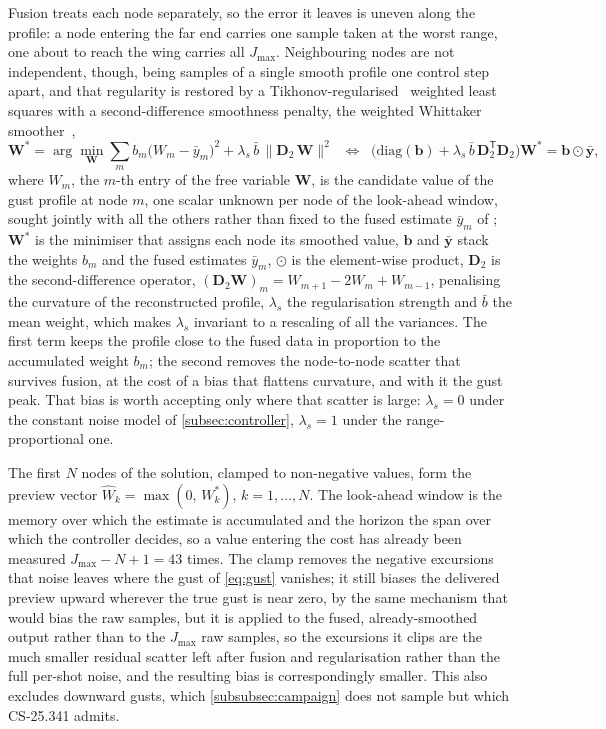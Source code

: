 Fusion treats each node separately, so the error it leaves is uneven along the profile: a node entering the far end carries one sample taken at the worst range, one about to reach the wing carries all $J_{\max}$. Neighbouring nodes are not independent, though, being samples of a single smooth profile one control step apart, and that regularity is restored by a Tikhonov-regularised~\cite{tikhonov1977solutions} weighted least squares with a second-difference smoothness penalty, the weighted Whittaker smoother~\cite{whittaker1923graduation,eilers2003perfect},
\begin{equation}
\mathbf{W}^\ast = \arg\min_{\mathbf{W}} \sum_m b_m\bigl(W_m - \bar{y}_m\bigr)^2
+ \lambda_s\,\bar{b}\,\bigl\lVert \mathbf{D}_2\,\mathbf{W} \bigr\rVert^2
\;\;\Longleftrightarrow\;\;
\bigl(\mathrm{diag}(\mathbf{b}) + \lambda_s\,\bar{b}\,\mathbf{D}_2^{\mathsf{T}}\mathbf{D}_2\bigr)\mathbf{W}^\ast = \mathbf{b}\odot\bar{\mathbf{y}},
\label{eq:tikhonov}
\end{equation}
where $W_m$, the $m$-th entry of the free variable $\mathbf{W}$, is the candidate value of the gust profile at node $m$, one scalar unknown per node of the look-ahead window, sought jointly with all the others rather than fixed to the fused estimate $\bar{y}_m$ of ; $\mathbf{W}^\ast$ is the minimiser that assigns each node its smoothed value, $\mathbf{b}$ and $\bar{\mathbf{y}}$ stack the weights $b_m$ and the fused estimates $\bar{y}_m$, $\odot$ is the element-wise product, $\mathbf{D}_2$ is the second-difference operator, $(\mathbf{D}_2\mathbf{W})_m = W_{m+1} - 2W_m + W_{m-1}$, penalising the curvature of the reconstructed profile, $\lambda_s$ the regularisation strength and $\bar{b}$ the mean weight, which makes $\lambda_s$ invariant to a rescaling of all the variances. The first term keeps the profile close to the fused data in proportion to the accumulated weight $b_m$; the second removes the node-to-node scatter that survives fusion, at the cost of a bias that flattens curvature, and with it the gust peak. That bias is worth accepting only where that scatter is large: $\lambda_s = 0$ under the constant noise model of \cref{subsec:controller}, $\lambda_s = 1$ under the range-proportional one.

The first $N$ nodes of the solution, clamped to non-negative values, form the preview vector $\widehat{W}_k = \max(0,\,W_k^\ast)$, $k = 1,\dots,N$. The look-ahead window is the memory over which the estimate is accumulated and the horizon the span over which the controller decides, so a value entering the cost has already been measured $J_{\max}-N+1 = 43$ times. The clamp removes the negative excursions that noise leaves where the gust of \cref{eq:gust} vanishes; it still biases the delivered preview upward wherever the true gust is near zero, by the same mechanism that would bias the raw samples, but it is applied to the fused, already-smoothed output rather than to the $J_{\max}$ raw samples, so the excursions it clips are the much smaller residual scatter left after fusion and regularisation rather than the full per-shot noise, and the resulting bias is correspondingly smaller. This also excludes downward gusts, which \cref{subsubsec:campaign} does not sample but which CS-25.341 admits.

